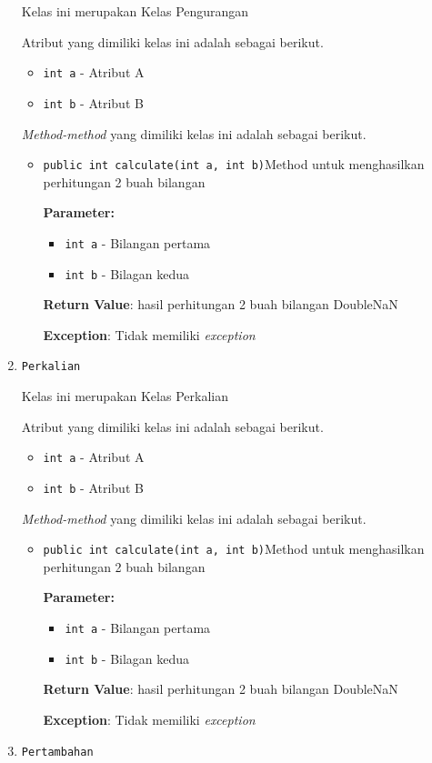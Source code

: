 \documentclass{article}
\begin{document}
\begin{enumerate}
Kelas ini merupakan Kelas Pengurangan

Atribut yang dimiliki kelas ini adalah sebagai berikut.
\begin{itemize}
\item \texttt{int a} - Atribut A
\item \texttt{int b} - Atribut B
\end{itemize}
\textit{Method-method} yang dimiliki kelas ini adalah sebagai berikut.
\begin{itemize}
\item \texttt{public int calculate(int a, int b)}Method untuk menghasilkan perhitungan 2 buah bilangan

\textbf{Parameter:}
\begin{itemize}
\item \texttt{int a} - 
Bilangan pertama
\item \texttt{int b} - 
Bilagan kedua
\end{itemize}
\textbf{Return Value}: hasil perhitungan 2 buah bilangan  DoubleNaN

\textbf{Exception}: Tidak memiliki \textit{exception}

\end{itemize}
\item \texttt{Perkalian}

Kelas ini merupakan Kelas Perkalian

Atribut yang dimiliki kelas ini adalah sebagai berikut.
\begin{itemize}
\item \texttt{int a} - Atribut A
\item \texttt{int b} - Atribut B
\end{itemize}
\textit{Method-method} yang dimiliki kelas ini adalah sebagai berikut.
\begin{itemize}
\item \texttt{public int calculate(int a, int b)}Method untuk menghasilkan perhitungan 2 buah bilangan

\textbf{Parameter:}
\begin{itemize}
\item \texttt{int a} - 
Bilangan pertama
\item \texttt{int b} - 
Bilagan kedua
\end{itemize}
\textbf{Return Value}: hasil perhitungan 2 buah bilangan  DoubleNaN

\textbf{Exception}: Tidak memiliki \textit{exception}

\end{itemize}
\item \texttt{Pertambahan}


\end{enumerate}
\end{document}
